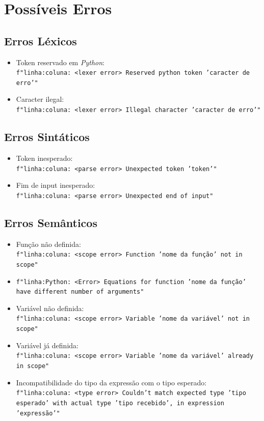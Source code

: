 \documentclass[11pt,a4paper]{report}
\begin{document}
\section{Possíveis Erros}
\subsection{Erros Léxicos}
\begin{itemize}
    \item Token reservado em \textit{Python}:\\ \texttt{f"{linha}:{coluna}: <lexer error> Reserved python token '{caracter de erro}'"}
    \item Caracter ilegal:\\ \texttt{f"{linha}:{coluna}: <lexer error> Illegal character '{caracter de erro}'"}
\end{itemize}
\subsection{Erros Sintáticos}
\begin{itemize}
  \item Token inesperado:\\ \texttt{f"{linha}:{coluna}: <parse error> Unexpected token '{token}'"}
  \item Fim de input inesperado:\\ \texttt{f"{linha}:{coluna}: <parse error> Unexpected end of input"}
\end{itemize}

\subsection{Erros Semânticos}
\begin{itemize}
\item Função não definida:  \\
  \texttt{f"{linha}:{coluna}: <scope error> Function '{nome da função}' not in scope"}
  \item \texttt{f"{linha}:{Python}: <Error> Equations for function '{nome da função}' have different number of arguments"}
  \item Variável não definida: \\ \texttt{f"{linha}:{coluna}: <scope error> Variable '{nome da variável}' not in scope"} 
  \item Variável já definida: \\ \texttt{f"{linha}:{coluna}: <scope error> Variable '{nome da variável}' already in scope"}
 \item Incompatibilidade do tipo da expressão com o tipo esperado:\\ \texttt{f"{linha}:{coluna}: <type error> Couldn't match expected type '{tipo esperado}' with actual type '{tipo recebido}', in expression '{expressão}'"}
\end{itemize}
\end{document}
